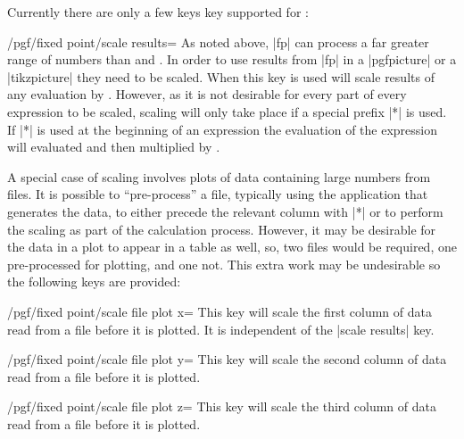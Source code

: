 Currently there are only a few keys key supported for :

\begin{key}{/pgf/fixed point/scale results=}
    As noted above, |fp| can process a far greater range of numbers than
    \pgfname{} and \tikzname{}. In order to use results from |fp| in a
    |{pgfpicture}| or a |{tikzpicture}| they need to be scaled. When this key
    is used \pgfname{} will scale results of any evaluation by .
    However, as it is not desirable for every part of every expression to be
    scaled, scaling will only take place if a special prefix |*| is used. If
    |*| is used at the beginning of an expression the evaluation of the
    expression will evaluated and then multiplied by .
\begin{codeexample}[preamble={\usepgflibrary{fixedpointarithmetic}}]
\end{codeexample}

    A special case of scaling involves plots of data containing large numbers
    from files. It is possible to ``pre-process'' a file, typically using the
    application that generates the data, to either precede the relevant column
    with |*| or to perform the scaling as part of the calculation process.
    However, it may be desirable for the data in a plot to appear in a table as
    well, so, two files would be required, one pre-processed for plotting, and
    one not. This extra work may be undesirable so the following keys are
    provided:

    \begin{key}{/pgf/fixed point/scale file plot x=}
        This key will scale the first column of data read from a file before it
        is plotted. It is independent of the |scale results| key.
    \end{key}

    \begin{key}{/pgf/fixed point/scale file plot y=}
        This key will scale the second column of data read from a file before
        it is plotted.
    \end{key}

    \begin{key}{/pgf/fixed point/scale file plot z=}
        This key will scale the third column of data read from a file before it
        is plotted.
    \end{key}
\end{key}

